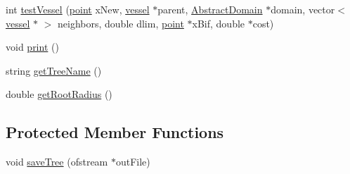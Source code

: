 \begin{DoxyCompactItemize}
\item 
int \hyperlink{class_f_r_r_va_vi_opt_c_c_o_s_tree_adb9397798ff7ca8cecbab33245e7fe2a}{test\+Vessel} (\hyperlink{structpoint}{point} x\+New, \hyperlink{structvessel}{vessel} $\ast$parent, \hyperlink{class_abstract_domain}{Abstract\+Domain} $\ast$domain, vector$<$ \hyperlink{structvessel}{vessel} $\ast$ $>$ neighbors, double dlim, \hyperlink{structpoint}{point} $\ast$x\+Bif, double $\ast$cost)
\item 
void \hyperlink{class_f_r_r_va_vi_opt_c_c_o_s_tree_a3e332df98c4a3fc66455aea22d563cf8}{print} ()
\item 
string \hyperlink{class_f_r_r_va_vi_opt_c_c_o_s_tree_a3c7f7ca4242f71697c421298b3ab968b}{get\+Tree\+Name} ()
\item 
double \hyperlink{class_f_r_r_va_vi_opt_c_c_o_s_tree_ae86b6d6890262180b555166853190dd1}{get\+Root\+Radius} ()
\end{DoxyCompactItemize}
\subsection*{Protected Member Functions}
\begin{DoxyCompactItemize}
\item 
void \hyperlink{class_f_r_r_va_vi_opt_c_c_o_s_tree_af4d961db2a4b60ea9bafde5cbf6758c6}{save\+Tree} (ofstream $\ast$out\+File)
\end{DoxyCompactItemize}
